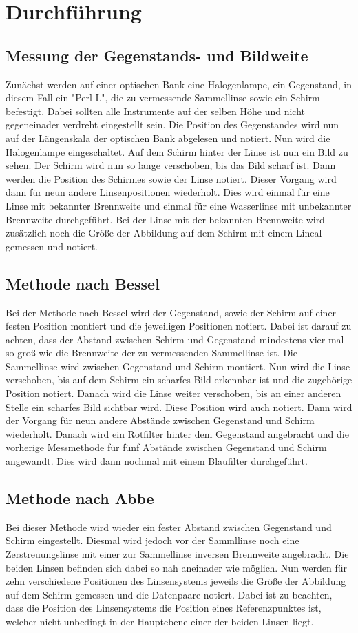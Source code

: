 \section{Durchführung}
\label{sec:Durchführung}
\subsection{Messung der Gegenstands- und Bildweite}
Zunächst werden auf einer optischen Bank eine Halogenlampe, ein Gegenstand, in diesem Fall ein "Perl L", die zu vermessende Sammellinse sowie ein Schirm befestigt.
Dabei sollten alle Instrumente auf der selben Höhe und nicht gegeneinader verdreht eingestellt sein. Die Position des Gegenstandes wird nun
auf der Längenskala der optischen Bank abgelesen und notiert. Nun wird die Halogenlampe eingeschaltet. Auf dem Schirm hinter der Linse ist nun ein Bild zu sehen.
Der Schirm wird nun so lange verschoben, bis das Bild scharf ist. Dann werden die Position des Schirmes sowie der Linse notiert. Dieser Vorgang wird dann für neun
andere Linsenpositionen wiederholt. Dies wird einmal für eine Linse mit bekannter Brennweite und einmal für eine Wasserlinse mit unbekannter Brennweite durchgeführt.
Bei der Linse mit der bekannten Brennweite wird zusätzlich noch die Größe der Abbildung auf dem Schirm mit einem Lineal gemessen und notiert.

\subsection{Methode nach Bessel}
\label{sec:bessel}
Bei der Methode nach Bessel wird der Gegenstand, sowie der Schirm auf einer festen Position montiert und die jeweiligen Positionen notiert. Dabei ist darauf zu achten,
dass der Abstand zwischen Schirm und Gegenstand mindestens vier mal so groß wie die Brennweite der zu vermessenden Sammellinse ist. Die Sammellinse wird zwischen
Gegenstand und Schirm montiert. Nun wird die Linse verschoben, bis auf dem Schirm ein scharfes Bild erkennbar ist und die zugehörige Position notiert. Danach wird die
Linse weiter verschoben, bis an einer anderen Stelle ein scharfes Bild sichtbar wird. Diese Position wird auch notiert. Dann wird der Vorgang für neun andere
Abstände zwischen Gegenstand und Schirm wiederholt. Danach wird ein Rotfilter hinter dem Gegenstand angebracht und die vorherige Messmethode für fünf Abstände zwischen
Gegenstand und Schirm angewandt. Dies wird dann nochmal mit einem Blaufilter durchgeführt.

\subsection{Methode nach Abbe}
Bei dieser Methode wird wieder ein fester Abstand zwischen Gegenstand und Schirm eingestellt. Diesmal wird jedoch vor der Sammllinse noch eine Zerstreuungslinse mit
einer zur Sammellinse inversen Brennweite angebracht. Die beiden Linsen befinden sich dabei so nah aneinader wie möglich. Nun werden für zehn verschiedene Positionen des
Linsensystems jeweils die Größe der Abbildung auf dem Schirm gemessen und die Datenpaare notiert. Dabei ist zu beachten, dass die Position des Linsensystems die Position
eines Referenzpunktes ist, welcher nicht unbedingt in der Hauptebene einer der beiden Linsen liegt.
